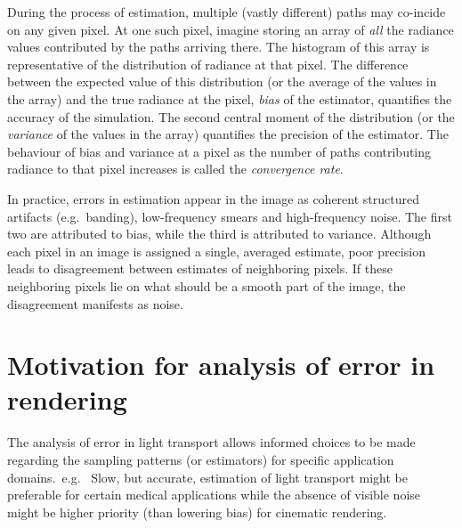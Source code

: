 \documentclass{acmsiggraph}
\begin{document}

During the process of estimation, multiple (vastly different) paths may co-incide on any given pixel. At one such pixel, imagine storing an array of \textit{all} the radiance values contributed by the paths arriving there. The histogram of this array is representative of the distribution of radiance at that pixel. The difference between the expected value of this distribution (or the average of the values in the array) and the true radiance at the pixel, \textit{bias} of the estimator, quantifies the accuracy of the simulation.  The second central moment of the distribution (or the \textit{variance} of the values in the array) quantifies the precision of the estimator. The behaviour of bias and variance at a pixel as the number of paths contributing radiance to that pixel increases is called the \textit{convergence rate}. 

In practice, errors in estimation appear in the image as coherent structured artifacts (e.g.~banding), low-frequency smears and high-frequency noise. The first two are attributed to bias, while the third is attributed to variance. Although each pixel in an image is assigned a single, averaged estimate, poor precision leads to disagreement between estimates of neighboring pixels. If these neighboring pixels lie on what should be a smooth part of the image, the disagreement manifests as noise.

\section{Motivation for analysis of error in rendering}
The analysis of error in light transport allows informed choices to be made regarding the sampling patterns (or estimators) for specific application domains.~e.g.~ Slow, but accurate, estimation of light transport might be preferable for certain medical applications while the absence of visible noise might be higher priority (than lowering bias) for cinematic rendering.
\end{document}
